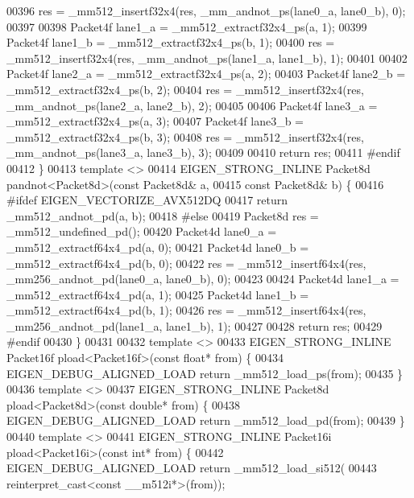 \begin{DoxyCode}
00396   res = \_mm512\_insertf32x4(res, \_mm\_andnot\_ps(lane0\_a, lane0\_b), 0);
00397 
00398   Packet4f lane1\_a = \_mm512\_extractf32x4\_ps(a, 1);
00399   Packet4f lane1\_b = \_mm512\_extractf32x4\_ps(b, 1);
00400   res = \_mm512\_insertf32x4(res, \_mm\_andnot\_ps(lane1\_a, lane1\_b), 1);
00401 
00402   Packet4f lane2\_a = \_mm512\_extractf32x4\_ps(a, 2);
00403   Packet4f lane2\_b = \_mm512\_extractf32x4\_ps(b, 2);
00404   res = \_mm512\_insertf32x4(res, \_mm\_andnot\_ps(lane2\_a, lane2\_b), 2);
00405 
00406   Packet4f lane3\_a = \_mm512\_extractf32x4\_ps(a, 3);
00407   Packet4f lane3\_b = \_mm512\_extractf32x4\_ps(b, 3);
00408   res = \_mm512\_insertf32x4(res, \_mm\_andnot\_ps(lane3\_a, lane3\_b), 3);
00409 
00410   \textcolor{keywordflow}{return} res;
00411 \textcolor{preprocessor}{#endif}
00412 \}
00413 \textcolor{keyword}{template} <>
00414 EIGEN\_STRONG\_INLINE Packet8d pandnot<Packet8d>(\textcolor{keyword}{const} Packet8d& a,
00415                                                \textcolor{keyword}{const} Packet8d& b) \{
00416 \textcolor{preprocessor}{#ifdef EIGEN\_VECTORIZE\_AVX512DQ}
00417   \textcolor{keywordflow}{return} \_mm512\_andnot\_pd(a, b);
00418 \textcolor{preprocessor}{#else}
00419   Packet8d res = \_mm512\_undefined\_pd();
00420   Packet4d lane0\_a = \_mm512\_extractf64x4\_pd(a, 0);
00421   Packet4d lane0\_b = \_mm512\_extractf64x4\_pd(b, 0);
00422   res = \_mm512\_insertf64x4(res, \_mm256\_andnot\_pd(lane0\_a, lane0\_b), 0);
00423 
00424   Packet4d lane1\_a = \_mm512\_extractf64x4\_pd(a, 1);
00425   Packet4d lane1\_b = \_mm512\_extractf64x4\_pd(b, 1);
00426   res = \_mm512\_insertf64x4(res, \_mm256\_andnot\_pd(lane1\_a, lane1\_b), 1);
00427 
00428   \textcolor{keywordflow}{return} res;
00429 \textcolor{preprocessor}{#endif}
00430 \}
00431 
00432 \textcolor{keyword}{template} <>
00433 EIGEN\_STRONG\_INLINE Packet16f pload<Packet16f>(\textcolor{keyword}{const} \textcolor{keywordtype}{float}* from) \{
00434   EIGEN\_DEBUG\_ALIGNED\_LOAD \textcolor{keywordflow}{return} \_mm512\_load\_ps(from);
00435 \}
00436 \textcolor{keyword}{template} <>
00437 EIGEN\_STRONG\_INLINE Packet8d pload<Packet8d>(\textcolor{keyword}{const} \textcolor{keywordtype}{double}* from) \{
00438   EIGEN\_DEBUG\_ALIGNED\_LOAD \textcolor{keywordflow}{return} \_mm512\_load\_pd(from);
00439 \}
00440 \textcolor{keyword}{template} <>
00441 EIGEN\_STRONG\_INLINE Packet16i pload<Packet16i>(\textcolor{keyword}{const} \textcolor{keywordtype}{int}* from) \{
00442   EIGEN\_DEBUG\_ALIGNED\_LOAD \textcolor{keywordflow}{return} \_mm512\_load\_si512(
00443       reinterpret\_cast<const \_\_m512i*>(from));

\end{DoxyCode}
